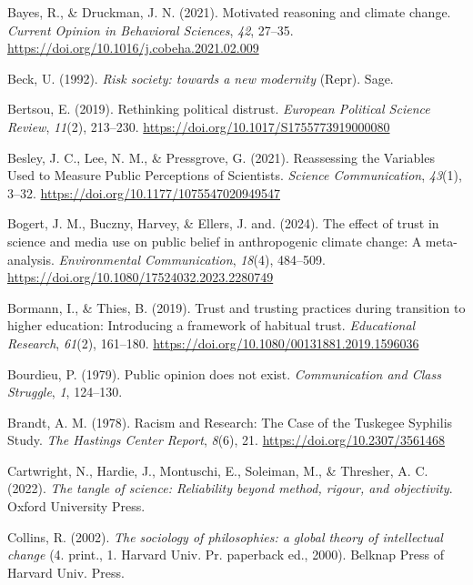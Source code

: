 \documentclass[
  jou,
  floatsintext,
  longtable,
  nolmodern,
  notxfonts,
  notimes,
  colorlinks=true,linkcolor=blue,citecolor=blue,urlcolor=blue]{apa7}
\newlength{\cslhangindent}
\newenvironment{CSLReferences}[2] %
 {\begin{list}{}{%
  \setlength{\itemindent}{0pt}
  \setlength{\leftmargin}{0pt}
  \setlength{\parsep}{0pt}
  \ifodd #1
   \setlength{\leftmargin}{\cslhangindent}
   \setlength{\itemindent}{-1\cslhangindent}
  \fi
  \setlength{\itemsep}{#2\baselineskip}}}
 {\end{list}}
\begin{document}
\begin{CSLReferences}{1}{0}
Bayes, R., \& Druckman, J. N. (2021). Motivated reasoning and climate
change. \emph{Current Opinion in Behavioral Sciences}, \emph{42},
27--35. \url{https://doi.org/10.1016/j.cobeha.2021.02.009}

Beck, U. (1992). \emph{Risk society: towards a new modernity} (Repr).
Sage.

Bertsou, E. (2019). Rethinking political distrust. \emph{European
Political Science Review}, \emph{11}(2), 213--230.
\url{https://doi.org/10.1017/S1755773919000080}

Besley, J. C., Lee, N. M., \& Pressgrove, G. (2021). Reassessing the
Variables Used to Measure Public Perceptions of Scientists.
\emph{Science Communication}, \emph{43}(1), 3--32.
\url{https://doi.org/10.1177/1075547020949547}

Bogert, J. M., Buczny, Harvey, \& Ellers, J. and. (2024). The effect of
trust in science and media use on public belief in anthropogenic climate
change: A meta-analysis. \emph{Environmental Communication},
\emph{18}(4), 484--509.
\url{https://doi.org/10.1080/17524032.2023.2280749}

Bormann, I., \& Thies, B. (2019). Trust and trusting practices during
transition to higher education: Introducing a framework of habitual
trust. \emph{Educational Research}, \emph{61}(2), 161--180.
\url{https://doi.org/10.1080/00131881.2019.1596036}

Bourdieu, P. (1979). Public opinion does not exist. \emph{Communication
and Class Struggle}, \emph{1}, 124--130.

Brandt, A. M. (1978). Racism and Research: The Case of the Tuskegee
Syphilis Study. \emph{The Hastings Center Report}, \emph{8}(6), 21.
\url{https://doi.org/10.2307/3561468}

Cartwright, N., Hardie, J., Montuschi, E., Soleiman, M., \& Thresher, A.
C. (2022). \emph{The tangle of science: Reliability beyond method,
rigour, and objectivity}. Oxford University Press.

Collins, R. (2002). \emph{The sociology of philosophies: a global theory
of intellectual change} (4. print., 1. Harvard Univ. Pr. paperback ed.,
2000). Belknap Press of Harvard Univ. Press.


\end{CSLReferences}
\end{document}
